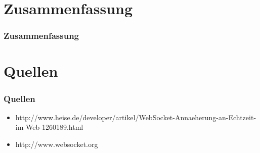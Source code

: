 \documentclass{beamer}
\begin{document}
\section{Zusammenfassung}
\begin{frame}
\frametitle{Zusammenfassung}
\end{frame}

\section{Quellen}
\begin{frame}
\frametitle{Quellen}
\begin{itemize}
\item http://www.heise.de/developer/artikel/WebSocket-Annaeherung-an-Echtzeit-im-Web-1260189.html
\item http://www.websocket.org
\end{itemize}
\end{frame}
\end{document}
